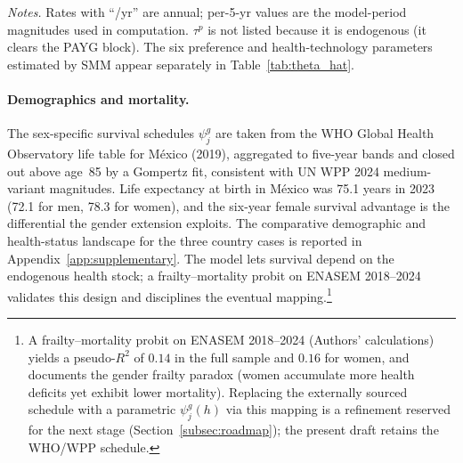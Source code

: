 \documentclass[12pt,a4paper]{article}
\begin{document}
\begin{table}[H]
\vspace{0.5em}
\begin{minipage}{0.92\textwidth}
\footnotesize \textit{Notes.} Rates with ``/yr'' are annual; per-5-yr values are the model-period magnitudes used in computation. $\tau^p$ is not listed because it is endogenous (it clears the PAYG block). The six preference and health-technology parameters estimated by SMM appear separately in Table~\ref{tab:theta_hat}.
\end{minipage}
\end{table}

\paragraph{Demographics and mortality.}
The sex-specific survival schedules $\psi^g_j$ are taken from the WHO Global Health Observatory life table for M\'exico (2019), aggregated to five-year bands and closed out above age~85 by a Gompertz fit, consistent with UN WPP 2024 medium-variant magnitudes. Life expectancy at birth in M\'exico was 75.1 years in 2023 (72.1 for men, 78.3 for women), and the six-year female survival advantage is the differential the gender extension exploits. The comparative demographic and health-status landscape for the three country cases is reported in Appendix~\ref{app:supplementary}. The model lets survival depend on the endogenous health stock; a frailty--mortality probit on ENASEM 2018--2024 validates this design and disciplines the eventual mapping.\footnote{A frailty--mortality probit on ENASEM 2018--2024 (Authors' calculations) yields a pseudo-$R^2$ of $0.14$ in the full sample and $0.16$ for women, and documents the gender frailty paradox (women accumulate more health deficits yet exhibit lower mortality). Replacing the externally sourced schedule with a parametric $\psi^g_j(h)$ via this mapping is a refinement reserved for the next stage (Section~\ref{subsec:roadmap}); the present draft retains the WHO/WPP schedule.}
\end{document}
